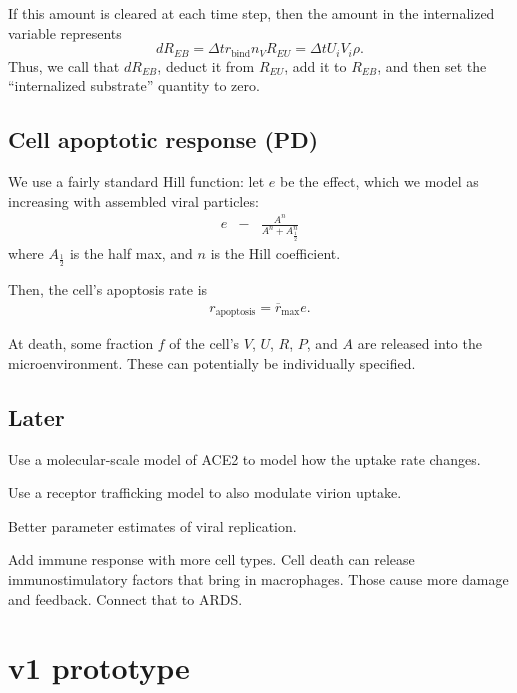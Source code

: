 \documentclass[12point]{article}
\begin{document}
If this amount is cleared at each time step, then the amount in the internalized variable 
represents 
\begin{equation}
dR_{EB} = \Delta t r_\textrm{bind} n_V R_{EU} = \Delta t U_i V_i \rho.
\end{equation}
Thus, we call that $dR_{EB}$, deduct it from $R_{EU}$, add it to $R_{EB}$, and then 
set the ``internalized substrate'' quantity to zero. 

 


\subsection{Cell apoptotic response (PD)}
We use a fairly standard Hill function: let $e$ be the effect, which we model as increasing with assembled viral particles: 
\begin{eqnarray}
e & - & \frac{ A^n  }{ A^n + A_{\frac{1}{2}}^n  }
\end{eqnarray}
where $A_{\frac{1}{2}}$ is the half max, and $n$ is the Hill coefficient. 

Then, the cell's apoptosis rate is 
\begin{eqnarray}
r_{\textrm{apoptosis}} = \overline{r}_\textrm{max} e. 
\end{eqnarray}

At death, some fraction $f$ of the cell's $V$, $U$, $R$, $P$, and $A$ are released into the microenvironment. These can potentially be individually specified. 

\subsection{Later}
Use a molecular-scale model of ACE2 to model how the uptake rate changes. 

Use a receptor trafficking model to also modulate virion uptake. 

Better parameter estimates of viral replication.

Add immune response with more cell types. Cell death can release immunostimulatory factors that bring in macrophages. Those cause more damage and feedback. Connect that to ARDS. 









\section{v1 prototype}
\end{document}
